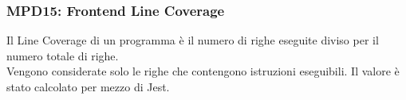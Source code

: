 \subsubsection{MPD15: Frontend Line Coverage}\label{sssec:frontend_line_coverage}
Il Line Coverage di un programma è il numero di righe eseguite diviso per il numero totale di righe.\\
Vengono considerate solo le righe che contengono istruzioni eseguibili.
Il valore è stato calcolato per mezzo di Jest.
